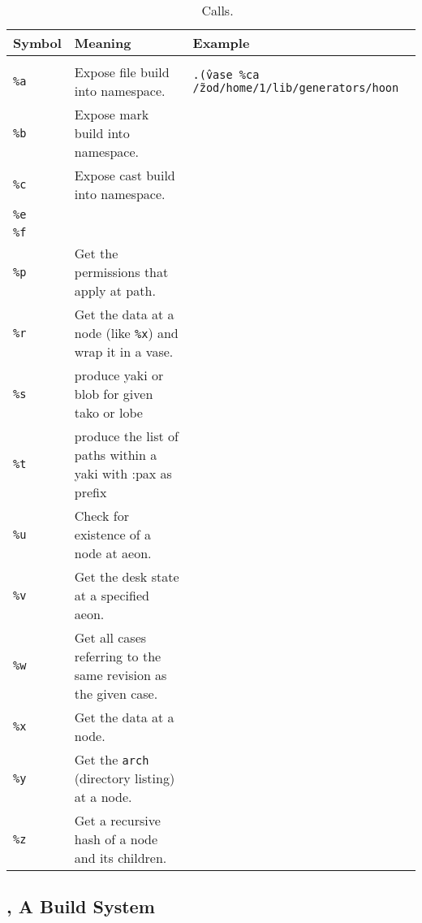 \begin{table}[h!]
  \begin{center}
    \caption{\clay~\dotket~Calls.}
    \label{ha:clay}
    \begin{tabular}{lll}
      Symbol & Meaning & Example \\
      \hline \\
      \texttt{\%a} & Expose file build into namespace. & \texttt{.\^(vase \%ca /\~zod/home/1/lib/generators/hoon} \\
      \texttt{\%b} & Expose mark build into namespace. & \\
      \texttt{\%c} & Expose cast build into namespace. & \\
      \texttt{\%e} & & \\
      \texttt{\%f} & & \\
      \texttt{\%p} & Get the permissions that apply at path. & \\
      \texttt{\%r} & Get the data at a node (like \texttt{\%x}) and wrap it in a vase. & \\
      \texttt{\%s} & produce yaki or blob for given tako or lobe & \\
      \texttt{\%t} & produce the list of paths within a yaki with :pax as prefix & \\
      \texttt{\%u} & Check for existence of a node at aeon. & \\
      \texttt{\%v} & Get the desk state at a specified aeon. & \\
      \texttt{\%w} & Get all cases referring to the same revision as the given case. & \\
      \texttt{\%x} & Get the data at a node. & \\
      \texttt{\%y} & Get the \texttt{arch} (directory listing) at a node. & \\
      \texttt{\%z} & Get a recursive hash of a node and its children. & \\
    \end{tabular}
  \end{center}
\end{table}



\subsection[\ford]{\ford, A Build System}

